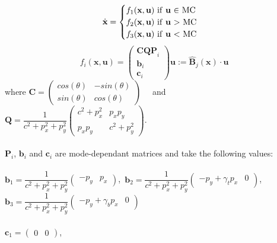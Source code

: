 \documentclass[12,twoside]{TFG-GM}
\theoremstyle{definition}
\theoremstyle{remark}
\begin{document}
\begin{equation} \label{eq:motion_equation}
\dot{\textbf{x}} = \begin{cases}
					f_1(\textbf{x}, \textbf{u}) \,\, \text{if \textbf{u} $\in$ MC} \\
					f_2(\textbf{x}, \textbf{u}) \,\, \text{if \textbf{u} $>$ MC} \\
					f_3(\textbf{x}, \textbf{u}) \,\, \text{if \textbf{u} $<$ MC}
\end{cases}
\end{equation}
\begin{equation}
f_i(\textbf{x}, \textbf{u}) = 
\begin{pmatrix} 
	\textbf{CQP}_i \\ 
	\textbf{b}_i \\
	\textbf{c}_i 
\end{pmatrix} \textbf{u} := \hat{\textbf{B}}_j(\textbf{x})\cdot\textbf{u}
\end{equation}
where 
$\textbf{C} = \begin{pmatrix} 
cos(\theta) & -sin(\theta) \\
sin(\theta) & cos(\theta)
\end{pmatrix}
$ \,\,\,\, and  \,\,\,\,
$\textbf{Q} = \dfrac{1}{c^2 + p_x^2 + p_y^2} \begin{pmatrix} 
c^2 + p_x^2 & p_x p_y \\
p_x p_y & c^2 + p_y^2
\end{pmatrix}$. \\ \\
$\textbf{P}_i$, $\textbf{b}_i$ and $\textbf{c}_i$ are mode-dependant matrices and take the following values: \\ \\
$\textbf{b}_1 = \dfrac{1}{c^2 + p_x^2 + p_y^2} \begin{pmatrix} -p_y & p_x \end{pmatrix}$, \,$\textbf{b}_2 = \dfrac{1}{c^2 + p_x^2 + p_y^2} \begin{pmatrix} -p_y + \gamma_t p_x & 0 \end{pmatrix}$, \,$\textbf{b}_3 = \dfrac{1}{c^2 + p_x^2 + p_y^2} \begin{pmatrix} -p_y + \gamma_b p_x & 0 \end{pmatrix}$ \\ \\
$\textbf{c}_1 = \begin{pmatrix}
0 & 0
\end{pmatrix}$,\,\,\,\,\,\,\,\,\,\,\,\,\,\,\,\,\,\,\,\,\,\,\,\,\,\,\,\,\,\,\,\,\,\,\,\,\,\,\,\,\,\,\,\,\,\,
\end{document}
